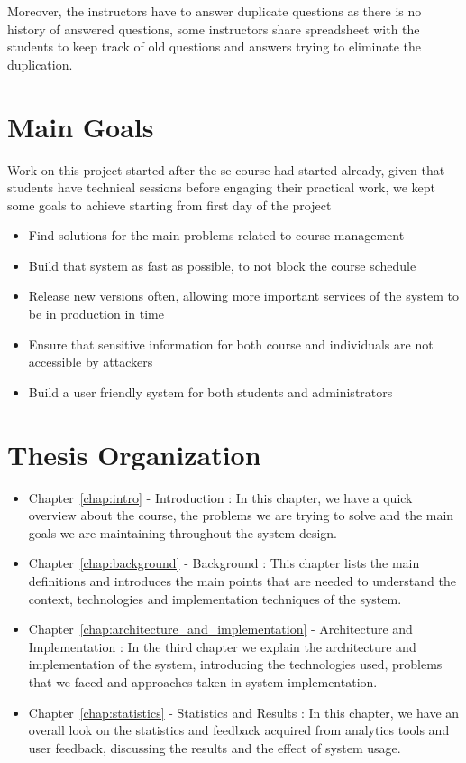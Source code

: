 \newParagraph
Moreover, the instructors have to answer duplicate questions as there is no history of answered questions, some instructors share
spreadsheet with the students to keep track of old questions and answers trying to eliminate the duplication.

\section{Main Goals}
\label{sec:main-goals}
Work on this project started after the \ac{se} course had started already, given that students have technical sessions before
engaging their practical work, we kept some goals to achieve starting from first day of the project
\begin{itemize}
  \item Find solutions for the main problems related to course management
  \item Build that system as fast as possible, to not block the course schedule
  \item Release new versions often, allowing more important services of the system to be in production in time
  \item Ensure that sensitive information for both course and individuals are not accessible by attackers
  \item Build a user friendly system for both students and administrators
\end{itemize}

\section{Thesis Organization}
\label{sec:thesis-organization}
\begin{itemize}
  \item Chapter~\ref{chap:intro} - Introduction : In this chapter, we have a quick overview about the course, the problems
  we are trying to solve and the main goals we are maintaining throughout the system design.
  \item Chapter~\ref{chap:background} - Background : This chapter lists the main definitions and introduces the main points that
  are needed to understand the context, technologies and implementation techniques of the system.
  \item Chapter~\ref{chap:architecture_and_implementation} - Architecture and Implementation : In the third chapter we explain the architecture
  and implementation of the system, introducing the technologies used, problems that we faced and approaches taken in system implementation.
  \item Chapter~\ref{chap:statistics} - Statistics and Results : In this chapter, we have an overall look on the statistics and feedback
  acquired from analytics tools and user feedback, discussing the results and the effect of system usage.
\end{itemize}
